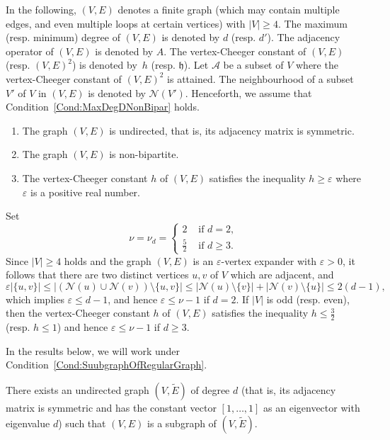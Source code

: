 \documentclass[ALCO,Unicode,published]{cedram}
\newcommand{\calN}{\ensuremath{\mathcal{N}}}
\newcommand{\scrA}{\ensuremath{\mathscr{A}}}
\newcommand{\tth}{\ensuremath{\mathfrak{h}}}
\begin{document}
In the following, $(V, E)$ denotes a finite graph (which may contain multiple edges, and even multiple loops at certain vertices) with $|V| \geq 4$. The maximum (resp. minimum) degree of $(V, E)$ is denoted by $d$ (resp. $d'$). The adjacency operator of $(V, E)$ is denoted by $A$. The vertex-Cheeger constant of $(V, E)$ (resp. $(V, E)^2$) is denoted by~$h$ (resp. $\tth$). Let $\scrA$ be a subset of $V$ where the vertex-Cheeger constant of $(V, E)^2$ is attained. The neighbourhood of a subset $V'$ of $V$ in $(V, E)$ is denoted by $\calN(V')$. Henceforth, we assume that Condition~\ref{Cond:MaxDegDNonBipar} holds. 
\begin{condition}
\label{Cond:MaxDegDNonBipar}
\quad 
\begin{enumerate}
\item 
The graph $(V, E)$ is undirected, that is, its adjacency matrix is symmetric. 
\item The graph $(V, E)$ is non-bipartite. 
\item The vertex-Cheeger constant $h$ of $(V, E)$ satisfies the inequality $h\geq  \varepsilon$ where $\varepsilon$ is a positive real  number. 
\end{enumerate}
\end{condition}
Set
$$
\nu = \nu_d
= 
\begin{cases}
2 & \text{ if } d = 2, \\
\frac 52 & \text{ if } d\geq 3.
\end{cases}
$$
Since $|V|\geq 4$ holds and the graph $(V, E)$ is an $\varepsilon$-vertex expander with $\varepsilon>0$, it follows that there are two distinct vertices $u, v$ of $V$ which are adjacent, and 
$$
\varepsilon |\{u, v\}|
 \leq |(\calN(u) \cup \calN(v) ) \setminus \{u, v\}| 
 \leq |\calN(u) \setminus \{v\}| + |\calN(v)\setminus \{u\}|
 \leq 2(d-1),
$$
which implies $\varepsilon \leq d-1$, and hence $\varepsilon \leq \nu -1$ if $d = 2$. If $|V|$ is odd (resp. even), then the vertex-Cheeger constant $h$ of $(V, E)$ satisfies the inequality $h \leq \frac 32$ (resp. $h \leq 1$) and hence $\varepsilon \leq \nu -1$ if $d\geq 3$. 

In the results below, we will work under Condition~\ref{Cond:SuubgraphOfRegularGraph}. 

\begin{condition}
\label{Cond:SuubgraphOfRegularGraph}
There exists an undirected graph $(V, \widetilde E)$ of degree $d$ (that is, its adjacency matrix is symmetric and has the constant vector $[1, \ldots, 1]$ as an eigenvector with eigenvalue $d$) such that $(V, E)$ is a subgraph of $(V, \widetilde E)$. 
\end{condition}
\end{document}

